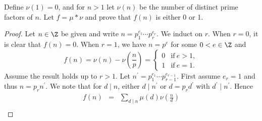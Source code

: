 \documentclass[10pt]{amsart}
\begin{document}
\begin{thm}
  Define $\nu(1) = 0$, and for $n > 1$ let $\nu(n)$ be the number of distinct prime factors of $n$.
  Let $f = \mu \ast \nu$ and prove that $f(n)$ is either 0 or 1.
 
  \begin{proof}
    Let $n \in \Z$ be given and write $n = p_1^{e_1} \cdots p_r^{e_r}$.
    We induct on $r$.
    When $r = 0$, it is clear that $f(n) = 0$.
    When $r = 1$, we have $n = p^e$ for some $0 < e \in \Z$ and
    $$f(n) = \nu(n) - \nu\left(\frac{n}{p}\right) = \left\{ 
    \begin{array}{ll}
      0 & \text{if}\ e > 1,\\
      1 & \text{if}\ e = 1.
    \end{array}\right.$$
    Assume the result holds up to $r > 1$.
    Let $n^\prime = p_1^{e_1} \cdots p_{r-1}^{e_{r-1}}$.
    First assume $e_r = 1$ and thus $n = p_rn^\prime$.
    We note that for $d \mid n$, either $d \mid n^\prime$ or $d = p_rd^\prime$ with $d^\prime \mid n^\prime$.
    Hence
    \begin{eqnarray*}
      f(n) &=& \sum_{d \mid n} \mu(d)\nu\left(\frac{n}{d}\right)\\

\end{eqnarray*}
\end{proof}
\end{thm}
\end{document}
